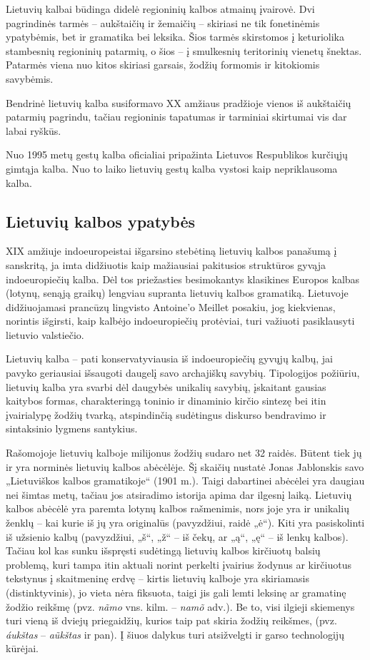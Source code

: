 \begin{multicols}{2}
Lietuvių kalbai būdinga didelė regioninių kalbos atmainų įvairovė. Dvi pagrindinės tarmės – aukštaičių ir žemaičių – skiriasi ne tik fonetinėmis ypatybėmis, bet ir gramatika bei leksika. Šios tarmės skirstomos į keturiolika stambesnių regioninių patarmių, o šios – į smulkesnių teritorinių vienetų šnektas. Patarmės viena nuo kitos skiriasi garsais, žodžių formomis ir kitokiomis savybėmis.

Bendrinė lietuvių kalba susiformavo XX amžiaus pradžioje vienos iš aukštaičių patarmių pagrindu, tačiau regioninis tapatumas ir tarminiai skirtumai vis dar labai ryškūs.

Nuo 1995 metų gestų kalba oficialiai pripažinta Lietuvos Respublikos kurčiųjų gimtąja kalba. Nuo to laiko lietuvių gestų kalba vystosi kaip nepriklausoma kalba.

\subsection{Lietuvių kalbos ypatybės}

 XIX amžiuje indoeuropeistai išgarsino stebėtiną lietuvių kalbos panašumą į sanskritą, ja imta didžiuotis kaip mažiausiai pakitusios struktūros gyvąja indoeuropiečių kalba. Dėl tos priežasties besimokantys klasikines Europos kalbas (lotynų, senąją graikų) lengviau supranta lietuvių kalbos gramatiką. Lietuvoje didžiuojamasi prancūzų lingvisto Antoine’o Meillet posakiu, jog kiekvienas, norintis išgirsti, kaip kalbėjo indoeuropiečių protėviai, turi važiuoti pasiklausyti lietuvio valstiečio.

Lietuvių kalba – pati konservatyviausia iš indoeuropiečių gyvųjų kalbų, jai pavyko geriausiai išsaugoti daugelį savo archajiškų savybių. Tipologijos požiūriu, lietuvių kalba yra svarbi dėl daugybės unikalių savybių, įskaitant gausias kaitybos formas, charakteringą toninio ir dinaminio kirčio sintezę bei itin įvairialypę žodžių tvarką, atspindinčią sudėtingus diskurso bendravimo ir sintaksinio lygmens santykius.

Rašomojoje lietuvių kalboje milijonus žodžių sudaro net 32 raidės. Būtent tiek jų ir yra norminės lietuvių kalbos abėcėlėje. Šį skaičių nustatė Jonas Jablonskis savo „Lietuviškos kalbos gramatikoje“ (1901 m.). Taigi dabartinei abėcėlei yra daugiau nei šimtas metų, tačiau jos atsiradimo istorija apima dar ilgesnį laiką. Lietuvių kalbos abėcėlė yra paremta lotynų kalbos rašmenimis, nors joje yra ir unikalių ženklų – kai kurie iš jų yra originalūs (pavyzdžiui, raidė „ė“). Kiti yra pasiskolinti iš užsienio kalbų (pavyzdžiui, „š“, „ž“ – iš čekų,  ar „ą“, „ę“ – iš lenkų kalbos). Tačiau kol kas sunku išspręsti sudėtingą lietuvių kalbos kirčiuotų balsių problemą, kuri tampa itin aktuali norint perkelti įvairius žodynus ar kirčiuotus tekstynus į skaitmeninę erdvę – kirtis lietuvių kalboje yra skiriamasis (distinktyvinis), jo vieta nėra fiksuota, taigi jis gali lemti leksinę ar gramatinę žodžio reikšmę (pvz. \textit{nãmo} vns. kilm. – \textit{namõ} adv.). Be to, visi ilgieji skiemenys turi vieną iš dviejų priegaidžių, kurios taip pat skiria žodžių reikšmes, (pvz. \textit{áukštas} – \textit{aũkštas}  ir pan).
Į šiuos dalykus turi atsižvelgti ir garso technologijų kūrėjai.
    

\end{multicols}
